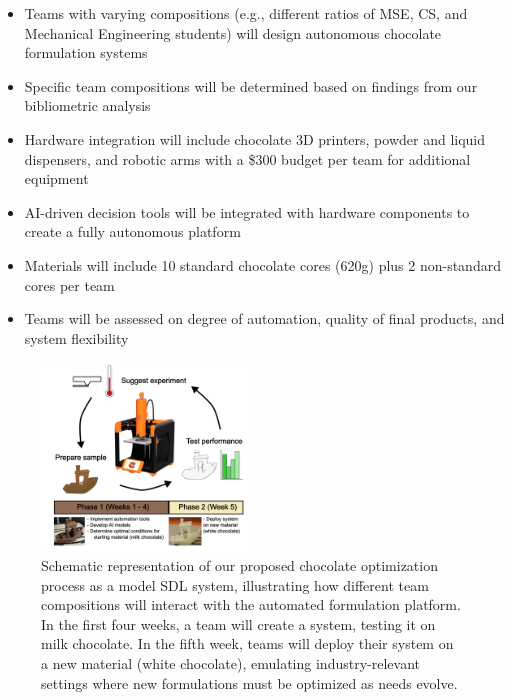 \documentclass[11pt,letterpaper,twocolumn]{article}
\begin{document}
\begin{itemize}
    \item Teams with varying compositions (e.g., different ratios of MSE, CS, and Mechanical Engineering students) will design autonomous chocolate formulation systems
    \item Specific team compositions will be determined based on findings from our bibliometric analysis
    \item Hardware integration will include chocolate 3D printers, powder and liquid dispensers, and robotic arms with a \$300 budget per team for additional equipment
    \item AI-driven decision tools will be integrated with hardware components to create a fully autonomous platform
    \item Materials will include 10 standard chocolate cores (620g) plus 2 non-standard cores per team
    \item Teams will be assessed on degree of automation, quality of final products, and system flexibility
\end{itemize}

\begin{figure}[t]
    \centering
    \includegraphics[width=0.49\textwidth]{chocolate-optimization-schematic.png}
    \caption{\small Schematic representation of our proposed chocolate optimization process as a model SDL system, illustrating how different team compositions will interact with the automated formulation platform. In the first four weeks, a team will create a system, testing it on milk chocolate. In the fifth week, teams will deploy their system on a new material (white chocolate), emulating industry-relevant settings where new formulations must be optimized as needs evolve.}
    \label{fig:chocolate_schematic}
\end{figure}

\end{document}

